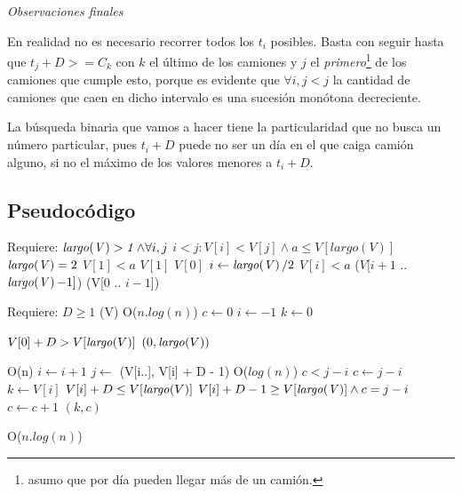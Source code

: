 \documentclass[11pt,a4paper]{article}
\begin{document}
\emph{Observaciones finales}

En realidad no es necesario recorrer todos los $t_i$ posibles. 
Basta con seguir hasta que $t_j + D >= C_k$ con $k$ el último de los camiones y $j$ el \emph{primero}\footnote{asumo que por día pueden llegar más de un camión.} de los camiones que cumple esto, porque es evidente que $\forall i, j < j$ la cantidad de camiones que caen en dicho intervalo es una sucesión monótona decreciente.

La búsqueda binaria que vamos a hacer tiene la particularidad que no busca un número particular, pues $t_i + D$ puede no ser un día en el que caiga camión alguno, si no el máximo de los valores menores a $t_i + D$. 

\subsection{Pseudocódigo}

\begin{codebox}
\zi \RComment Requiere: $\id{largo(V)>1} \wedge \forall i,j$ $i<j : V[i] < V[j] \wedge a \le V[largo(V)]$
\li \If $\id{largo(V)} = 2$ 
\li	\Then	
\li	\If $V[1] < a$
\li		\Then \Return $V[1]$
\li		\Else \Return $V[0]$
	\End
    \End
\li $i \gets \id{largo(V)} / 2$ 
\li \If $V[i] < a$ 
\li	\Then \Return {}($V[i+1$ .. $ \id{largo(V)}-1] $)
\li	\Else \Return {}(V[$0$ .. $i-1$])
    \End
\end{codebox}

\begin{codebox}
\zi \Comment Requiere: $D \ge 1$ 
\li {}(V) \RComment O($n.log(n)$)
\li $c \gets 0$
\li $i \gets -1$
\li $k \gets 0$

\li \If $V[0] + D > V[\id{largo}(V)]$
\li 	\Then \Return $(0, \id{largo}(V))$
\li	\Else 

\li \Repeat \RComment O(n)
\li 	$i \gets i + 1$
\li	$j \gets $ (V[i..], V[i] + D - 1) \RComment O($log(n)$)
\li	\If $c < j - i$
\li		\Then $c \gets j - i$
\li		      $k \gets V[i]$
	\End
\li \Until $V[i] + D \le V[\id{largo}(V)]$ 
\li	\If $V[i] + D - 1 \ge V[\id{largo(V)}] \wedge c = j - i $
\li		\Then 
\li			$ c \gets c + 1$
		\End
\li \Return $(k, c)$
	\End


\RComment O($n.log(n)$)
\end{codebox}
\end{document}
